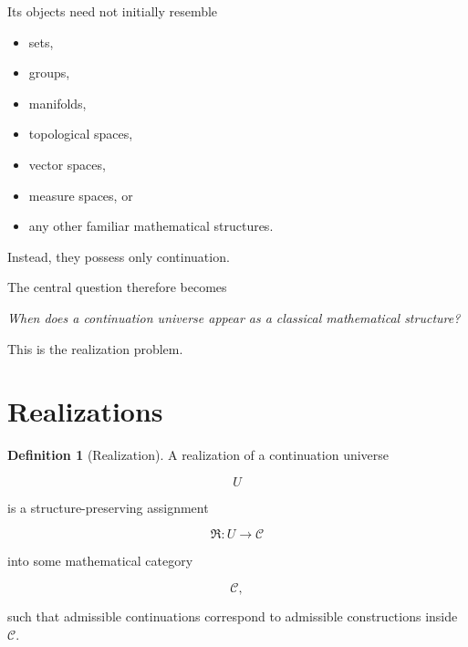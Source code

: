 \documentclass[13pt,openany]{book}
\theoremstyle{plain}
\theoremstyle{definition}
\newtheorem{definition}{Definition}[chapter]
\begin{document}
Its objects need not initially resemble

\begin{itemize}

\item sets,

\item groups,

\item manifolds,

\item topological spaces,

\item vector spaces,

\item measure spaces, or 

\item any other familiar mathematical structures.

\end{itemize}

Instead, they possess only continuation.

The central question therefore becomes

\begin{center}

\emph{When does a continuation universe appear as a classical mathematical structure?}

\end{center}

This is the realization problem.


\section{Realizations}

\begin{definition}[Realization]

A realization of a continuation universe

\[
U
\]

is a structure-preserving assignment

\[
\mathfrak R :
U
\longrightarrow
\mathcal C
\]

into some mathematical category

\[
\mathcal C,
\]

such that admissible continuations correspond to admissible constructions inside $\mathcal C$.

\end{definition}
\end{document}

